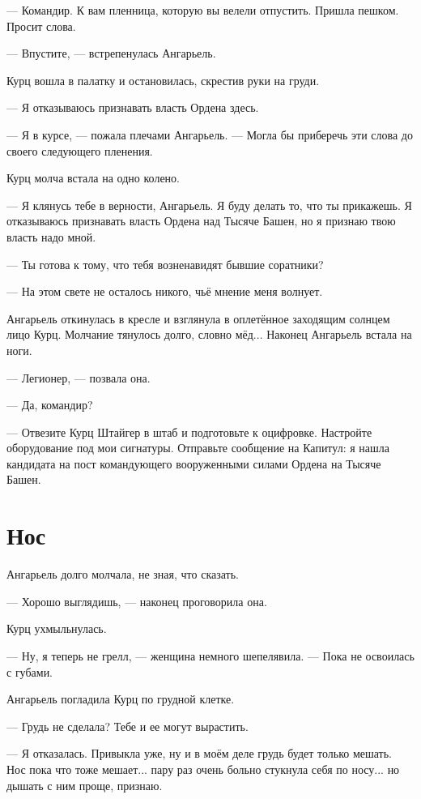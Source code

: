 --- Командир.
К вам пленница, которую вы велели отпустить.
Пришла пешком.
Просит слова.

--- Впустите, --- встрепенулась Ангарьель.

Курц вошла в палатку и остановилась, скрестив руки на груди.

--- Я отказываюсь признавать власть Ордена здесь.

--- Я в курсе, --- пожала плечами Ангарьель.
--- Могла бы приберечь эти слова до своего следующего пленения.

Курц молча встала на одно колено.

--- Я клянусь тебе в верности, Ангарьель.
Я буду делать то, что ты прикажешь.
Я отказываюсь признавать власть Ордена над Тысяче Башен, но я признаю твою власть надо мной.

--- Ты готова к тому, что тебя возненавидят бывшие соратники?

--- На этом свете не осталось никого, чьё мнение меня волнует.

Ангарьель откинулась в кресле и взглянула в оплетённое заходящим солнцем лицо Курц.
Молчание тянулось долго, словно мёд...
Наконец Ангарьель встала на ноги.

--- Легионер, --- позвала она.

--- Да, командир?

--- Отвезите Курц Штайгер в штаб и подготовьте к оцифровке.
Настройте оборудование под мои сигнатуры.
Отправьте сообщение на Капитул: я нашла кандидата на пост командующего вооруженными силами Ордена на Тысяче Башен.

\section{Нос}

Ангарьель долго молчала, не зная, что сказать.

--- Хорошо выглядишь, --- наконец проговорила она.

Курц ухмыльнулась.

--- Ну, я теперь не грелл, --- женщина немного шепелявила.
--- Пока не освоилась с губами.

Ангарьель погладила Курц по грудной клетке.

--- Грудь не сделала?
Тебе и ее могут вырастить.

--- Я отказалась.
Привыкла уже, ну и в моём деле грудь будет только мешать.
Нос пока что тоже мешает... пару раз очень больно стукнула себя по носу... но дышать с ним проще, признаю.

